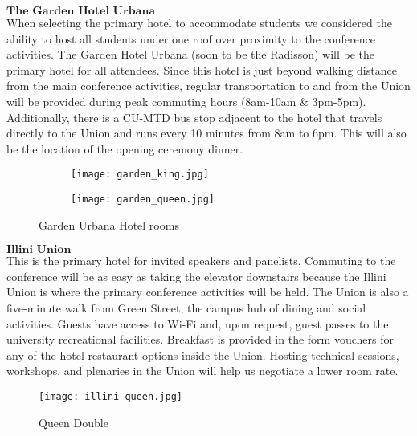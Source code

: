$\textbf{The Garden Hotel Urbana}$\\
When selecting the primary hotel to accommodate students we considered the ability to host all students under one roof over proximity to the conference activities. The Garden Hotel Urbana (soon to be the Radisson) will be the primary hotel for all attendees. Since this hotel is just beyond walking distance from the main conference activities, regular transportation to and from the Union will be provided during peak commuting hours (8am-10am $\&$ 3pm-5pm). Additionally, there is a CU-MTD bus stop adjacent to the hotel that travels directly to the Union and runs every 10 minutes from 8am to 6pm. This will also be the location of the opening ceremony dinner.\\ 
\begin{figure}[H]
	\centering
	\begin{subfigure}{0.5\textwidth}
		\centering
		\texttt{[image: garden\_king.jpg]}
	\end{subfigure}%
	\begin{subfigure}{0.5\textwidth}
		\centering
		\texttt{[image: garden\_queen.jpg]}
	\end{subfigure}
	\caption{Garden Urbana Hotel rooms}		
\end{figure} 

$\textbf{Illini Union}$\\
This is the primary hotel for invited speakers and panelists. Commuting to the conference will be as easy as taking the elevator downstairs because the Illini Union is where the primary conference activities will be held. The Union is also a five-minute walk from Green Street, the campus hub of dining and social activities. Guests have access to Wi-Fi and, upon request, guest passes to the university recreational facilities. Breakfast is provided in the form vouchers for any of the hotel restaurant options inside the Union. Hosting technical sessions, workshops, and plenaries in the Union will help us negotiate a lower room rate.\\

\begin{figure}[H]
	\centering
	\texttt{[image: illini-queen.jpg]}
	\caption{Queen Double}		
\end{figure} 

